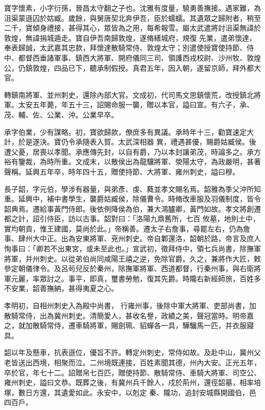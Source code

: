 \begin{pinyinscope}
 寶字懷素，小字衍孫，晉昌太守翻之子也。沈雅有度量，驍勇善撫接。遇家難，為沮渠蒙遜囚於姑臧。歲餘，與舅唐契北奔伊吾，臣於蠕蠕。其遺眾之歸附者，稍至二千，寶傾身禮接，甚得其心，眾皆為之用，每希報雪。屬太武遣將討沮渠無諱於敦煌，無諱捐城遁走。寶自伊吾南歸敦煌，遂脩繕城府，規復
 先業，遣弟懷達，奉表歸誠，太武嘉其忠款，拜懷達散騎常侍、敦煌太守；別遣使授寶使持節、侍中、都督西垂諸軍事、鎮西大將軍、開府儀同三司、領護西戎校尉、沙州牧、敦煌公，仍鎮敦煌，四品已下，聽承制假授。真君五年，因入朝，遂留京師，拜外都大官。



 轉鎮南將軍、並州刺史，還除內部大官。文成初，代司馬文思鎮懷荒，改授鎮北將軍。太安五年薨，年五十三，詔賜命服一襲，贈以本官，謚曰宣。有六子，承、茂、輔、佐、公業、沖。公業早卒。



 承字伯業，少有謀略。初，寶欲歸款，僚庶多有異議。承時年十三，勸寶速定大計，於是遂決。寶仍令承隨表入賀。太武深相器
 異，禮遇甚優，賜爵姑臧侯。後遭父憂，居喪以孝聞。承應傳先封，以自有爵，乃以本封讓弟茂，時論多之。承方裕有鑒裁，為時所重。文成末，以散侯出為龍驤將軍、滎陽太守，為政嚴明，甚著聲稱。延興五年卒，時年四十五，贈使持節、大將軍、雍州刺史，謚曰穆。



 長子韶，字元伯，學涉有器量，與弟彥、虔、蕤並孝文賜名焉。韶雅為季父沖所知重。延興中，補中書學生，襲爵姑臧侯，除儀曹令。時脩改車服及羽儀制度，皆令韶典焉。遷給事黃門侍郎。後依例降侯為伯，兼大鴻臚卿，黃門如故。孝文將創遷都之計，詔引侍臣，訪以古事。韶對曰：「洛陽九鼎舊所，七百
 攸墓，地則土中，實均朝貢，惟王建國，莫尚於此。」帝稱善。遷太子右詹事，尋罷左右，仍為詹事、肆州大中正。出為安東將軍、兗州刺史。帝自鄴還洛，韶朝於路，帝言及庶人恂事曰：「卿若不出東宮，或未至此也。」宣武初，徵拜侍中，領七兵尚書，除撫軍將軍，并州刺史。以從弟伯尚同咸陽王禧之逆，免除官爵。久之，兼將作大匠，敕參定朝儀律令。及呂茍兒反於秦州，除撫軍將軍、西道都督，行秦州事，與右衛將軍元麗，率眾討之。事平，即真，璽書勞勉，復其先爵。時隴右新經師旅，百姓多不安業，韶善撫納，甚得夷夏之心。



 孝明初，自相州刺史入為殿中尚書，
 行雍州事，後除中軍大將軍、吏部尚書，加散騎常侍，出為冀州刺史。清簡愛人，甚收名譽，政績之美，聲冠當時。明帝嘉之，就加散騎常侍，遷車騎將軍，賜劍珮、貂蟬各一具，驊騮馬一匹，并衣服寢具。



 韶以年及懸車，抗表遜位，優旨不許。轉定州刺史，常侍如故。及赴中山，冀州父老皆送出西境，相聚而泣。二州境既連接，百姓素聞其德，州內大安。正光五年，卒於官，年七十二。詔贈帛七百匹，贈使持節、散騎常侍、車騎大將軍、司空公、雍州刺史，謚曰文恭。既葬之後，有冀州兵千餘人，戍於荊州，還徑韶墓，相率培塚，數日方還，其遺愛如此。永安中，以剋定
 秦、隴功，追封安城縣開國伯，邑四百戶。




\end{pinyinscope}
